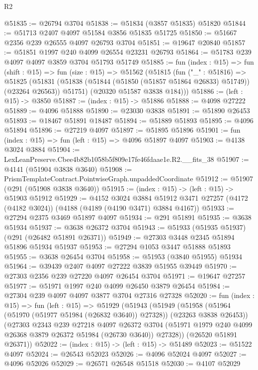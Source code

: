 \begin{lexlean}{R2}
\begin{coremodule}
@51835 := @26794 @3704
@51838 := @51834 (@3857 @51835) @51820
@51844 := @51713 @2407 @4097 @51584 @3856 @51835 @51725
@51850 := @51667 @2356 @239 @26555 @4097 @26793 @3704
@51851 := @19647 @20840
@51857 := @51851 @1997 @240 @4099 @26554 @23231 @26793
@51864 := @51783 @239 @4097 @4097 @3859 @3704 @51793 @51749
@51885 := fun (index : @15) =>
  fun (shift : @15) =>
  fun (size : @15) =>
  @51562
    (@51815
      (fun ("_" : @51816) =>
      @51825
        (@51831 (@51838 (@51844 (@51850 (@51857 @51864 @26833) @51749)) (@23264 @26563)) @51751)
        (@20320 @51587 @3838 @184)))
@51886 := (left : @15) -> @3850
@51887 := (index : @15) -> @51886
@51888 := @4098 @27222
@51889 := @4096 @51888
@51890 := @23030 @3838
@51891 := @51890 @26453
@51893 := @18467 @51891 @18487
@51894 := @51889 @51893
@51895 := @4096 @51894
@51896 := @27219 @4097
@51897 := @51895 @51896
@51901 := fun (index : @15) => fun (left : @15) => @4096 @51897 @4097
@51903 := @4138 @3024 @3884
@51904 := LexLeanPreserve.Cbee4b82b1058b5f809e17fe46fdaae1e.R2.__fits_38
@51907 := @4141 (@51904 @3838 @3640)
@51908 := PrismTemplateContract.PointwiseGraph.unpaddedCoordinate
@51912 := @51907 (@291 (@51908 @3838 @3640))
@51915 := (index : @15) -> (left : @15) -> @51903 @51912
@51929 := @4152
    @3024
    @3884
    @51912
    @3471
    @27257
    (@4172 (@4182 @3024))
    (@4188 (@4189 (@4190 @3471) @3884 @4167))
@51933 := @27294 @2375 @3469 @51897 @4097
@51934 := @291 @51891
@51935 := @3638 @51934
@51937 := @3638 @26372 @3704
@51943 := @51933 (@51935 @51937) (@291 (@26482 @51891 @26371))
@51949 := @27303 @3448 @2345 @51894 @51896 @51934 @51937
@51953 := @27294 @1053 @3447 @51888 @51893
@51955 := @3638 @26454 @3704
@51958 := @51953 (@3840 @51955) @51934
@51964 := @39439 @2407 @4097 @27222 @3839 @51955 @39449
@51970 := @27303 @2356 @239 @27220 @4097 @26454 @3704
@51971 := @19647 @27257
@51977 := @51971 @1997 @240 @4099 @26450 @3879 @26454
@51984 := @27304 @239 @4097 @4097 @3877 @3704 @27316 @27328
@52020 := fun (index : @15) =>
  fun (left : @15) =>
  @51929
    (@51943
      (@51949
        (@51958 (@51964 (@51970 (@51977 @51984 (@26832 @3640)) @27328)) (@23263 @3838 @26453))
        (@27303
          @2343
          @239
          @27218
          @4097
          @26372
          @3704
          (@51971 @1979 @240 @4099 @26368 @3879 @26372 @51984 (@26730 @3640))
          @27328))
      (@26520 @51891 @26371))
@52022 := (index : @15) -> (left : @15) -> @51489
@52023 := @51522 @4097
@52024 := @26543 @52023
@52026 := @4096 @52024 @4097
@52027 := @4096 @52026
@52029 := @26571 @26548 @51518
@52030 := @4107 @52029

\end{coremodule}
\end{lexlean}
